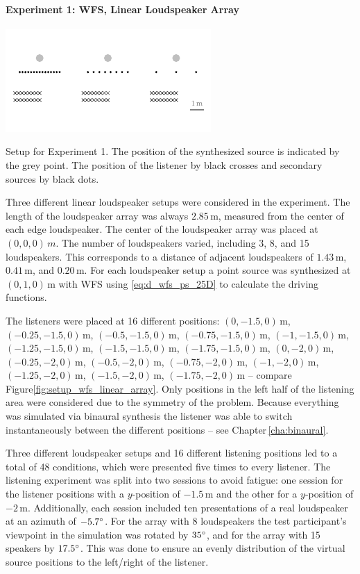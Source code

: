 \paragraph{Experiment 1: \ac{WFS}, Linear Loudspeaker Array}
\label{sec:experiment1_wfs_linear_array}
%
\begin{marginfigure}
    \includegraphics{fig5_01/fig5_01}
    \caption{Setup for Experiment 1. The position of the synthesized
    source is indicated by the grey point. The position of the listener by black
    crosses and secondary sources by black dots.
        }
    \label{fig:setup_wfs_linear_array}
\end{marginfigure}
%
Three different linear loudspeaker setups were considered in the experiment. The
length of the loudspeaker array was always $2.85$\,m, measured from the center
of each edge loudspeaker. The center of the loudspeaker array was placed at
$(0,0,0)\,m$. The number of loudspeakers varied,
including 3, 8, and 15 loudspeakers. This corresponds to a distance of
adjacent loudspeakers of $1.43$\,m, $0.41$\,m, and $0.20$\,m. For each loudspeaker
setup a point source was synthesized at $(0,1,0)$\,m with \ac{WFS}
using \eqref{eq:d_wfs_ps_25D} to calculate the driving functions.

The listeners were placed at 16 different positions: $(0,-1.5,0)$\,m,
$(-0.25,-1.5,0)$\,m, $(-0.5,-1.5,0)$\,m, $(-0.75,-1.5,0)$\,m,
$(-1,-1.5,0)$\,m,
$(-1.25,-1.5,0)$\,m, $(-1.5,-1.5,0)$\,m, $(-1.75,-1.5,0)$\,m, $(0,-2,0)$\,m,
$(-0.25,-2,0)$\,m, $(-0.5,-2,0)$\,m, $(-0.75,-2,0)$\,m, $(-1,-2,0)$\,m,
\linebreak
$(-1.25,-2,0)$\,m, $(-1.5,-2,0)$\,m, $(-1.75,-2,0)$\,m  -- compare
Figure\ref{fig:setup_wfs_linear_array}.
Only positions in the left half of the listening area were considered due to the
symmetry of the problem.
Because everything was simulated via
binaural synthesis the listener was able to switch instantaneously between the
different positions -- see Chapter\,\ref{cha:binaural}.

Three different loudspeaker setups and 16 different listening positions
led to a total of 48 conditions, which were presented five times to every
listener. The listening experiment was split into two sessions to avoid fatigue:
one session for the listener positions with a $y$-position of $-1.5$\,m and
the other for a $y$-position of $-2$\,m. Additionally, each session
included ten presentations of a real loudspeaker at an azimuth of
$-5.7^\circ$.
For the array with 8 loudspeakers the test participant's viewpoint in the simulation
was rotated by $35^\circ$, and for the array with 15 speakers by $17.5^\circ$.
This was done to ensure
an evenly distribution of the virtual source positions to the left/right of the
listener.

